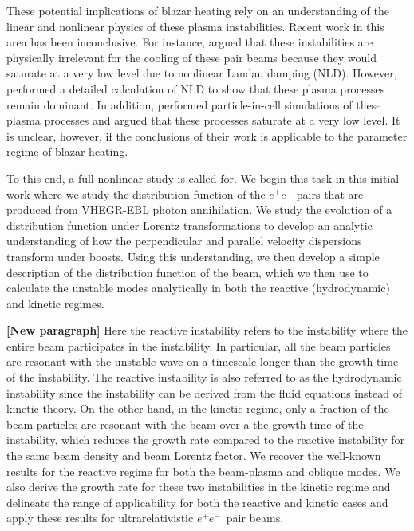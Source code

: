 \documentclass[usenatbib,iop,apj,numberedappendix]{aeb_emulateapj_2015}
\newcommand\ab[1]{{\color{green} \bf #1}} %
\newcommand{\epm}{\ensuremath{e^+e^-}}
\begin{document}
These potential implications of blazar heating rely on an understanding of the linear and nonlinear physics of these plasma instabilities.  Recent work in this area has been inconclusive.  For instance, \citet{Miniati+12} argued that these instabilities are physically irrelevant for the cooling of these pair beams because they would saturate at a very low level due to nonlinear Landau damping (NLD).  However, \citet{Chang+14} performed a detailed calculation of NLD to show that these plasma processes remain dominant.  In addition, \citet{Sironi+14} performed particle-in-cell simulations of these plasma processes and argued that these processes saturate at a very low level.  It is unclear, however, if the conclusions of their work is applicable to the parameter regime of blazar heating.

To this end, a full nonlinear study is called for.  We begin this task in this initial work where we study the distribution function of the $e^+e^-$ pairs that are produced from VHEGR-EBL photon annihilation.  We study the evolution of a distribution function under Lorentz transformations to develop an analytic understanding of how the perpendicular and parallel velocity dispersions transform under boosts.  Using this understanding, we then develop a simple description of the distribution function of the beam, which we then use to calculate the unstable modes analytically in both the reactive (hydrodynamic) and kinetic regimes.

\ab{[New paragraph]}
Here the reactive instability refers to the instability where the entire beam participates in the instability.  In particular, all the beam particles are resonant with the unstable wave on a timescale longer than the growth time of the instability.  The reactive instability is also referred to as the hydrodynamic instability since the instability can be derived from the fluid equations instead of kinetic theory.  On the other hand, in the kinetic regime, only a fraction of the beam particles are resonant with the beam over a the growth time of the instability, which reduces the growth rate compared to the reactive instability for the same beam density and beam Lorentz factor.  We recover the well-known results for the reactive regime for both the beam-plasma and oblique modes.  We also derive the growth rate for these two instabilities in the kinetic regime and delineate the range of applicability for both the reactive and kinetic cases and apply these results for ultrarelativistic \epm\ pair beams. 
\end{document}
